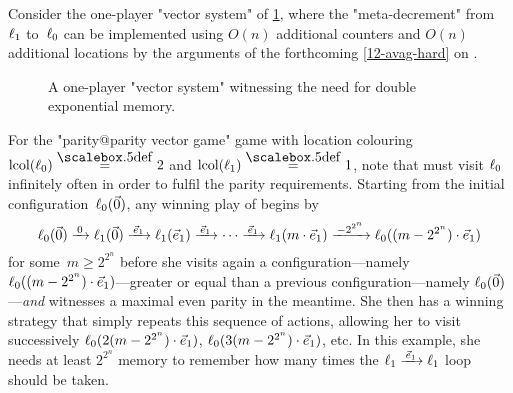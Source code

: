 
\begin{example}
  Consider the one-player "vector system" of \cref{12-fig-finitemem},
  where the "meta-decrement" from~$\ell_1$ to~$\ell_0$ can be
  implemented using $O(n)$ additional counters and $O(n)$ additional
  locations by the arguments of the forthcoming \cref{12-avag-hard}
  on .
  
  \begin{figure}[htbp]
    \centering
  \caption{\label{12-fig-finitemem} A one-player "vector system"
  witnessing the need for double exponential memory.}
  \end{figure}

  For the "parity@parity vector game" game with location colouring
  $\lcol(\loc_0)\eqdef 2$ and $\lcol(\loc_1)\eqdef 1$, note that \Eve
  must visit $\ell_0$ infinitely often in order to fulfil the parity
  requirements.  Starting from the initial
  configuration~$\ell_0(\vec 0)$, any winning play of \Eve begins
  by \begin{equation*} \loc_0(\vec 0)\step{0}\loc_1(\vec 0)\step{\vec
      e_1}\loc_1(\vec e_1)\step{\vec e_1}\cdots\step{\vec
      e_1}\loc_1(m\cdot\vec
    e_1)\mstep{-2^{2^n}}\loc_0((m-2^{2^n})\cdot\vec
    e_1) \end{equation*} for some~$m\geq 2^{2^n}$ before she visits
  again a
  configuration---namely~$\ell_0((m-2^{2^n})\cdot\vec e_1)$---greater
  or equal than a previous configuration---namely
  $\ell_0(\vec 0)$---\emph{and} witnesses a maximal even parity in the
  meantime.  She then has a winning strategy that simply repeats this
  sequence of actions, allowing her to visit successively
  $\ell_0(2(m-2^{2^n})\cdot\vec e_1)$,
  $\ell_0(3(m-2^{2^n})\cdot\vec e_1)$, etc.  In this example, she
  needs at least $2^{2^n}$ memory to remember how many times the
  $\loc_1\step{\vec e_1}\loc_1$ loop should be taken.
\end{example}

